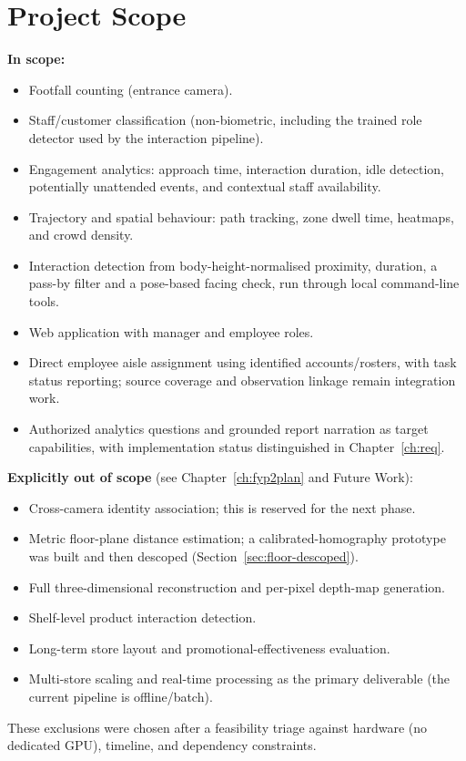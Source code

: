 \section{Project Scope}
\textbf{In scope:}
\begin{itemize}
\item Footfall counting (entrance camera).
\item Staff/customer classification (non-biometric, including the trained role detector used by the interaction pipeline).
\item Engagement analytics: approach time, interaction duration, idle detection, potentially unattended events, and contextual staff availability.
\item Trajectory and spatial behaviour: path tracking, zone dwell time, heatmaps, and crowd density.
\item Interaction detection from body-height-normalised proximity, duration, a pass-by filter and a pose-based facing check, run through local command-line tools.
\item Web application with manager and employee roles.
\item Direct employee aisle assignment using identified accounts/rosters, with task status reporting; source coverage and observation linkage remain integration work.
\item Authorized analytics questions and grounded report narration as target capabilities, with implementation status distinguished in Chapter~\ref{ch:req}.
\end{itemize}
\textbf{Explicitly out of scope} (see Chapter~\ref{ch:fyp2plan} and Future Work):
\begin{itemize}
\item Cross-camera identity association; this is reserved for the next phase.
\item Metric floor-plane distance estimation; a calibrated-homography prototype was built and then descoped (Section~\ref{sec:floor-descoped}).
\item Full three-dimensional reconstruction and per-pixel depth-map generation.
\item Shelf-level product interaction detection.
\item Long-term store layout and promotional-effectiveness evaluation.
\item Multi-store scaling and real-time processing as the primary deliverable (the current pipeline is offline/batch).
\end{itemize}
These exclusions were chosen after a feasibility triage against hardware (no dedicated GPU), timeline, and dependency constraints.

